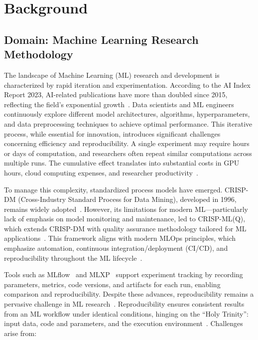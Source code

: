\documentclass{imc-inf} %
\begin{document}
\chapter{Background}

\section{Domain: Machine Learning Research Methodology}

The landscape of Machine Learning (ML) research and development is 
characterized by rapid iteration and experimentation. According to the 
AI Index Report 2023, AI-related publications have more than doubled since 
2015, reflecting the field's exponential growth~\cite{AIIndex2023}. Data 
scientists and ML engineers continuously explore different model architectures, 
algorithms, hyperparameters, and data preprocessing techniques to achieve 
optimal performance. This iterative process, while essential for innovation, 
introduces significant challenges concerning efficiency and reproducibility. 
A single experiment may require hours or days of computation, and researchers 
often repeat similar computations across multiple runs. The cumulative effect 
translates into substantial costs in GPU hours, cloud computing expenses, 
and researcher productivity~\cite{schubotz2022caching}.

To manage this complexity, standardized process models have emerged. 
CRISP-DM (Cross-Industry Standard Process for Data Mining), developed in 
1996, remains widely adopted~\cite{wirth2000crispdm}. However, its limitations 
for modern ML—particularly lack of emphasis on model monitoring and 
maintenance, led to CRISP-ML(Q), which extends CRISP-DM with quality assurance 
methodology tailored for ML applications~\cite{studer2021crispmlq}. This 
framework aligns with modern MLOps principles, which emphasize automation, 
continuous integration/deployment (CI/CD), and reproducibility throughout 
the ML lifecycle~\cite{kreuzberger2023mlops}.

Tools such as MLflow~\cite{zaharia2018mlflow} and MLXP~\cite{arbel2024mlxp} 
support experiment tracking by recording parameters, metrics, code versions, 
and artifacts for each run, enabling comparison and reproducibility. Despite 
these advances, reproducibility remains a pervasive challenge in ML 
research~\cite{semmelrock2023reproducibility}. Reproducibility ensures consistent 
results from an ML workflow under identical conditions, hinging on the 
``Holy Trinity'': input data, code and parameters, and the execution 
environment~\cite{schubotz2022caching}. Challenges arise from:
\end{document}
